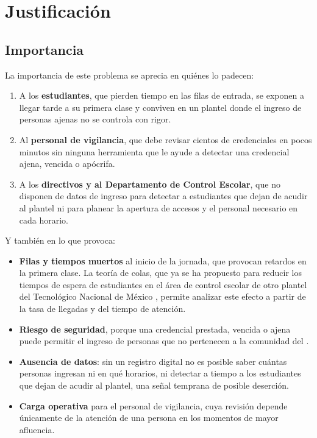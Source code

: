 \section{Justificación}

\subsection{Importancia}
La importancia de este problema se aprecia en quiénes lo padecen:
\begin{enumerate}
	\item A los \textbf{estudiantes}, que pierden tiempo en las filas de
	      entrada, se exponen a llegar tarde a su primera clase y conviven en un
	      plantel donde el ingreso de personas ajenas no se controla con rigor.
	\item Al \textbf{personal de vigilancia}, que debe revisar cientos de
	      credenciales en pocos minutos sin ninguna herramienta que le ayude a
	      detectar una credencial ajena, vencida o apócrifa.
	\item A los \textbf{directivos y al Departamento de Control Escolar}, que no
	      disponen de datos de ingreso para detectar a estudiantes que dejan de acudir
	      al plantel ni para planear la apertura de accesos y el personal necesario en
	      cada horario.
\end{enumerate}

Y también en lo que provoca:
\begin{itemize}
	\item \textbf{Filas y tiempos muertos} al inicio de la jornada, que
	      provocan retardos en la primera clase. La teoría de colas, que ya se ha
	      propuesto para reducir los tiempos de espera de estudiantes en el área de
	      control escolar de otro plantel del Tecnológico Nacional de México
	      \parencite{talavera2025espera}, permite analizar este efecto a partir de la
	      tasa de llegadas y del tiempo de atención.
	\item \textbf{Riesgo de seguridad}, porque una credencial prestada, vencida
	      o ajena puede permitir el ingreso de personas que no pertenecen a la
	      comunidad del \tescha{}.
	\item \textbf{Ausencia de datos}: sin un registro digital no es posible
	      saber cuántas personas ingresan ni en qué horarios, ni detectar a tiempo a
	      los estudiantes que dejan de acudir al plantel, una señal temprana de
	      posible deserción.
	\item \textbf{Carga operativa} para el personal de vigilancia, cuya
	      revisión depende únicamente de la atención de una persona en los momentos
	      de mayor afluencia.
\end{itemize}


